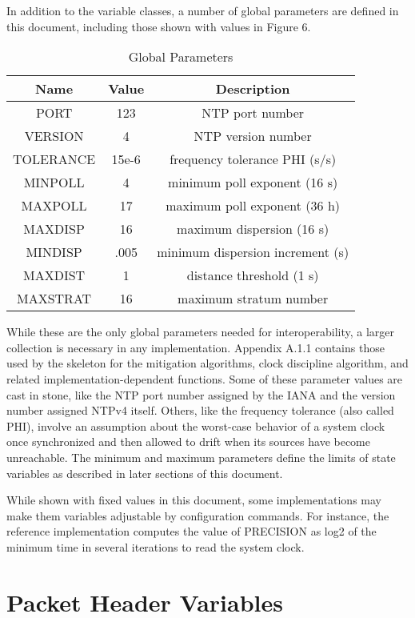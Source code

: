 In addition to the variable classes, a number of global parameters
are defined in this document, including those shown with values in
Figure 6.

\begin{table}[htb]
\center
\begin{tabular}{c | c | c}
Name & Value & Description \\
\hline
\hline
PORT & 123 & NTP port number \\
VERSION & 4 & NTP version number \\
TOLERANCE & 15e-6 & frequency tolerance PHI (s/s) \\
MINPOLL & 4 & minimum poll exponent (16 s) \\
MAXPOLL & 17 & maximum poll exponent (36 h) \\
MAXDISP & 16 & maximum dispersion (16 s) \\
MINDISP & .005 & minimum dispersion increment (s) \\
MAXDIST & 1 & distance threshold (1 s) \\
MAXSTRAT & 16 & maximum stratum number \\
\hline
\end{tabular}
\label{global_parameters}
\caption{Global Parameters}
\end{table}

While these are the only global parameters needed for
interoperability, a larger collection is necessary in any
implementation. Appendix A.1.1 contains those used by the skeleton
for the mitigation algorithms, clock discipline algorithm, and
related implementation-dependent functions. Some of these parameter
values are cast in stone, like the NTP port number assigned by the
IANA and the version number assigned NTPv4 itself. Others, like the
frequency tolerance (also called PHI), involve an assumption about
the worst-case behavior of a system clock once synchronized and then
allowed to drift when its sources have become unreachable. The
minimum and maximum parameters define the limits of state variables
as described in later sections of this document.

While shown with fixed values in this document, some implementations
may make them variables adjustable by configuration commands. For
instance, the reference implementation computes the value of
PRECISION as log2 of the minimum time in several iterations to read
the system clock.

\section{Packet Header Variables}

